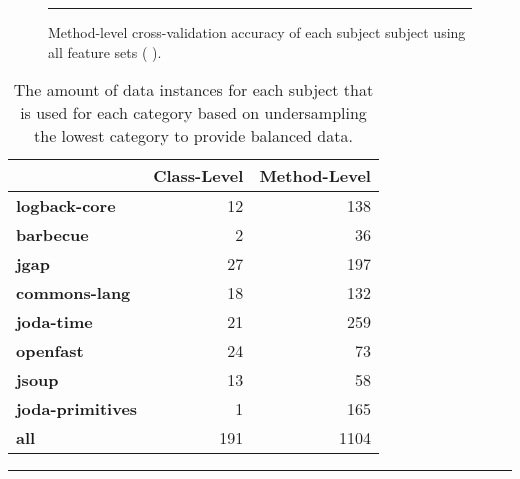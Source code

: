 \begin{figure}[ht!]
  \centering
  \begin{adjustbox}{max size={.95\textwidth}{.95\textheight}}
    
  \end{adjustbox}
  \caption{Method-level cross-validation accuracy of each subject subject using all feature sets (   ).}
  \vspace{1mm}
  \footnotesize{\emph{}}
  \vspace{2mm}
  \hrule
  \label{fig:individual_cross_validation_method_1_2_3_4_graph}
\end{figure}

\begin{table}[!ht]
  \centering
  \begin{threeparttable}
    \begin{tabular}{|l|r|r|}
      \rowcolor[RGB]{169,196,223}
      \hline & \textbf{Class-Level} & \textbf{Method-Level} \\
      \hline \cellcolor[RGB]{169,196,223} \textbf{logback-core} & 12 & 138 \\
      \hline \cellcolor[RGB]{169,196,223} \textbf{barbecue} & 2 & 36 \\
      \hline \cellcolor[RGB]{169,196,223} \textbf{jgap} & 27 & 197 \\
      \hline \cellcolor[RGB]{169,196,223} \textbf{commons-lang} & 18 & 132 \\
      \hline \cellcolor[RGB]{169,196,223} \textbf{joda-time} & 21 & 259 \\
      \hline \cellcolor[RGB]{169,196,223} \textbf{openfast} & 24 & 73 \\
      \hline \cellcolor[RGB]{169,196,223} \textbf{jsoup} & 13 & 58 \\
      \hline \cellcolor[RGB]{169,196,223} \textbf{joda-primitives} & 1 & 165 \\
      \hline \cellcolor[RGB]{169,196,223} \textbf{all} & 191 & 1104 \\
      \hline
    \end{tabular}
  \end{threeparttable}
  \caption{The amount of data instances for each subject that is used for each category based on undersampling the lowest category to provide balanced data.}
  \vspace{2mm}
  \hrule
  \label{tab:experiments_undersampled_data}
\end{table}

